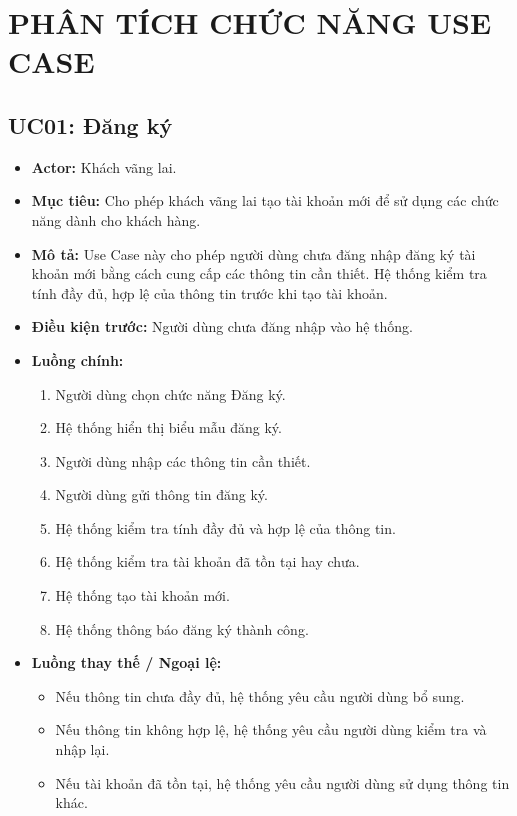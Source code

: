 \chapter{PHÂN TÍCH CHỨC NĂNG USE CASE}\label{chap3_intro}
\vspace{-40pt}

\section{UC01: Đăng ký}
\begin{itemize}
    \item \textbf{Actor:} Khách vãng lai.
    \item \textbf{Mục tiêu:} Cho phép khách vãng lai tạo tài khoản mới để sử dụng các chức năng dành cho khách hàng.
    \item \textbf{Mô tả:} Use Case này cho phép người dùng chưa đăng nhập đăng ký tài khoản mới bằng cách cung cấp các thông tin cần thiết. Hệ thống kiểm tra tính đầy đủ, hợp lệ của thông tin trước khi tạo tài khoản.
    \item \textbf{Điều kiện trước:} Người dùng chưa đăng nhập vào hệ thống.
    \item \textbf{Luồng chính:}
    \begin{enumerate}
        \item Người dùng chọn chức năng Đăng ký.
        \item Hệ thống hiển thị biểu mẫu đăng ký.
        \item Người dùng nhập các thông tin cần thiết.
        \item Người dùng gửi thông tin đăng ký.
        \item Hệ thống kiểm tra tính đầy đủ và hợp lệ của thông tin.
        \item Hệ thống kiểm tra tài khoản đã tồn tại hay chưa.
        \item Hệ thống tạo tài khoản mới.
        \item Hệ thống thông báo đăng ký thành công.
    \end{enumerate}
    \item \textbf{Luồng thay thế / Ngoại lệ:}
    \begin{itemize}
        \item Nếu thông tin chưa đầy đủ, hệ thống yêu cầu người dùng bổ sung.
        \item Nếu thông tin không hợp lệ, hệ thống yêu cầu người dùng kiểm tra và nhập lại.
        \item Nếu tài khoản đã tồn tại, hệ thống yêu cầu người dùng sử dụng thông tin khác.

\end{itemize}
\end{itemize}

